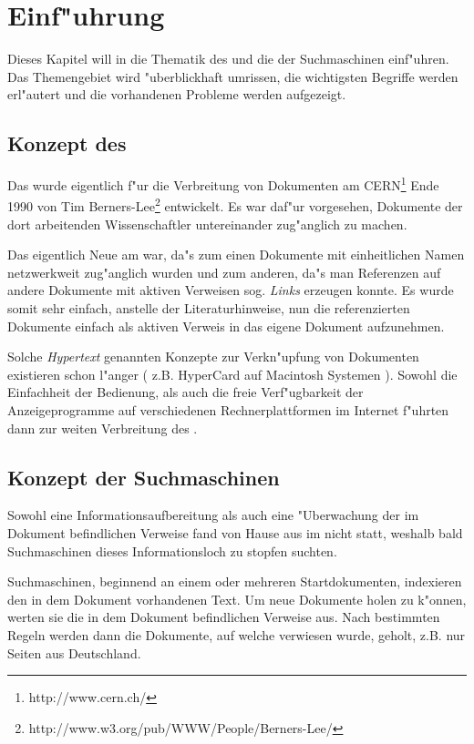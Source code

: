 \chapter{Einf"uhrung}
Dieses Kapitel will in die Thematik des \www und die der Suchmaschinen einf"uhren. Das Themengebiet wird "uberblickhaft umrissen, die wichtigsten Begriffe werden erl"autert und die vorhandenen Probleme werden aufgezeigt.


\section{Konzept des \www}
Das \www wurde eigentlich f"ur die Verbreitung von Dokumenten am CERN\footnote{http://www.cern.ch/} Ende 1990 von Tim Berners-Lee\footnote{http://www.w3.org/pub/WWW/People/Berners-Lee/} entwickelt. Es war daf"ur vorgesehen, Dokumente der dort arbeitenden Wissenschaftler untereinander zug"anglich zu machen.

Das eigentlich Neue am \www war, da"s zum einen Dokumente mit einheitlichen Namen netzwerkweit zug"anglich wurden und zum anderen, da"s man Referenzen auf andere Dokumente mit aktiven Verweisen sog. {\it Links} erzeugen konnte. Es wurde somit sehr einfach, anstelle der Literaturhinweise, nun die referenzierten Dokumente einfach als aktiven Verweis in das eigene Dokument aufzunehmen.

Solche {\em Hypertext} genannten Konzepte zur Verkn"upfung von Dokumenten existieren schon l"anger ( z.B. HyperCard auf Macintosh Systemen ). Sowohl die Einfachheit der Bedienung, als auch die freie Verf"ugbarkeit der Anzeigeprogramme auf verschiedenen Rechnerplattformen im Internet f"uhrten dann zur weiten Verbreitung des \www.


\section{Konzept der Suchmaschinen}
Sowohl eine Informationsaufbereitung als auch eine "Uberwachung der im Dokument befindlichen Verweise fand von Hause aus im \www nicht statt, weshalb bald Suchmaschinen dieses Informationsloch zu stopfen suchten.

Suchmaschinen, beginnend an einem oder mehreren Startdokumenten, indexieren den in dem Dokument vorhandenen Text. Um neue Dokumente holen zu k"onnen, werten sie die in dem Dokument befindlichen Verweise aus. Nach bestimmten Regeln werden dann die Dokumente, auf welche verwiesen wurde, geholt, z.B. nur Seiten aus Deutschland. 

